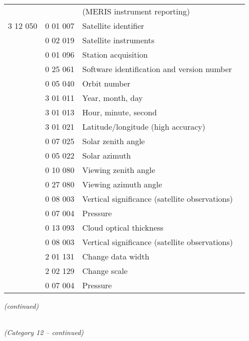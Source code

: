 \begin{longtable}[]{@{}llll@{}}
& & (MERIS instrument reporting) &\tabularnewline
3 12 050 & 0 01 007 & Satellite identifier &\tabularnewline
& 0 02 019 & Satellite instruments &\tabularnewline
& 0 01 096 & Station acquisition &\tabularnewline
& 0 25 061 & Software identification and version number &\tabularnewline
& 0 05 040 & Orbit number &\tabularnewline
& 3 01 011 & Year, month, day &\tabularnewline
& 3 01 013 & Hour, minute, second &\tabularnewline
& 3 01 021 & Latitude/longitude (high accuracy) &\tabularnewline
& 0 07 025 & Solar zenith angle &\tabularnewline
& 0 05 022 & Solar azimuth &\tabularnewline
& 0 10 080 & Viewing zenith angle &\tabularnewline
& 0 27 080 & Viewing azimuth angle &\tabularnewline
& 0 08 003 & Vertical significance (satellite observations) &\tabularnewline
& 0 07 004 & Pressure &\tabularnewline
& 0 13 093 & Cloud optical thickness &\tabularnewline
& 0 08 003 & Vertical significance (satellite observations) &\tabularnewline
& 2 01 131 & Change data width &\tabularnewline
& 2 02 129 & Change scale &\tabularnewline
& 0 07 004 & Pressure &\tabularnewline
\bottomrule
\end{longtable}

\emph{(continued)}

\emph{\\
(Category 12 -- continued)}


